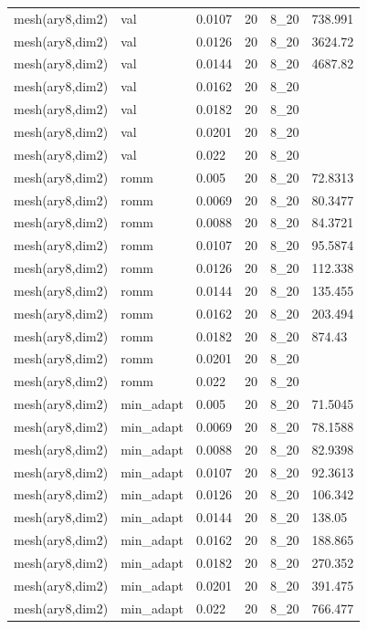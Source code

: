 \begin{longtable}[H]{llllll}
mesh(ary8,dim2) & val        & 0.0107 & 20 & 8\_20 & 738.991 \\
mesh(ary8,dim2) & val        & 0.0126 & 20 & 8\_20 & 3624.72 \\
mesh(ary8,dim2) & val        & 0.0144 & 20 & 8\_20 & 4687.82 \\
mesh(ary8,dim2) & val        & 0.0162 & 20 & 8\_20 &         \\
mesh(ary8,dim2) & val        & 0.0182 & 20 & 8\_20 &         \\
mesh(ary8,dim2) & val        & 0.0201 & 20 & 8\_20 &         \\
mesh(ary8,dim2) & val        & 0.022  & 20 & 8\_20 &         \\ \hline
mesh(ary8,dim2) & romm       & 0.005  & 20 & 8\_20 & 72.8313 \\
mesh(ary8,dim2) & romm       & 0.0069 & 20 & 8\_20 & 80.3477 \\
mesh(ary8,dim2) & romm       & 0.0088 & 20 & 8\_20 & 84.3721 \\
mesh(ary8,dim2) & romm       & 0.0107 & 20 & 8\_20 & 95.5874 \\
mesh(ary8,dim2) & romm       & 0.0126 & 20 & 8\_20 & 112.338 \\
mesh(ary8,dim2) & romm       & 0.0144 & 20 & 8\_20 & 135.455 \\
mesh(ary8,dim2) & romm       & 0.0162 & 20 & 8\_20 & 203.494 \\
mesh(ary8,dim2) & romm       & 0.0182 & 20 & 8\_20 & 874.43  \\
mesh(ary8,dim2) & romm       & 0.0201 & 20 & 8\_20 &         \\
mesh(ary8,dim2) & romm       & 0.022  & 20 & 8\_20 &         \\ \hline
mesh(ary8,dim2) & min\_adapt & 0.005  & 20 & 8\_20 & 71.5045 \\
mesh(ary8,dim2) & min\_adapt & 0.0069 & 20 & 8\_20 & 78.1588 \\
mesh(ary8,dim2) & min\_adapt & 0.0088 & 20 & 8\_20 & 82.9398 \\
mesh(ary8,dim2) & min\_adapt & 0.0107 & 20 & 8\_20 & 92.3613 \\
mesh(ary8,dim2) & min\_adapt & 0.0126 & 20 & 8\_20 & 106.342 \\
mesh(ary8,dim2) & min\_adapt & 0.0144 & 20 & 8\_20 & 138.05  \\
mesh(ary8,dim2) & min\_adapt & 0.0162 & 20 & 8\_20 & 188.865 \\
mesh(ary8,dim2) & min\_adapt & 0.0182 & 20 & 8\_20 & 270.352 \\
mesh(ary8,dim2) & min\_adapt & 0.0201 & 20 & 8\_20 & 391.475 \\
mesh(ary8,dim2) & min\_adapt & 0.022  & 20 & 8\_20 & 766.477
\end{longtable}

